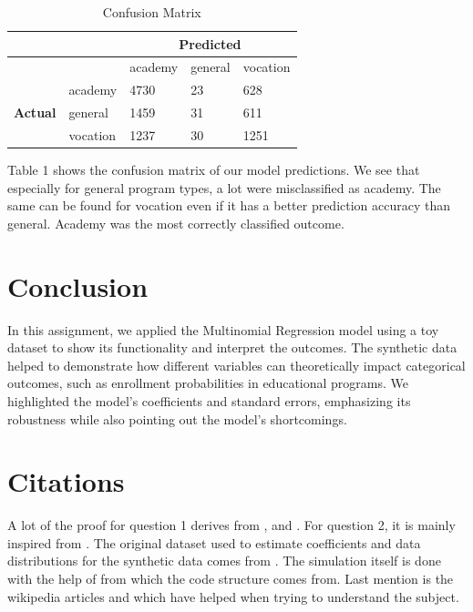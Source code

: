 \documentclass[12pt]{article}
\begin{document}
\begin{table}[h]
\centering
\begin{tabular}{|c|l|lll|}
\hline
\multicolumn{1}{|l|}{}           &          & \multicolumn{3}{c|}{\textbf{Predicted}}                                \\ \hline
\multicolumn{1}{|l|}{}           &          & \multicolumn{1}{l|}{academy} & \multicolumn{1}{l|}{general} & vocation \\ \hline
\multirow{3}{*}{\textbf{Actual}} & academy  & \multicolumn{1}{l|}{4730}    & \multicolumn{1}{l|}{23}      & 628      \\ \cline{2-5} 
                                 & general  & \multicolumn{1}{l|}{1459}    & \multicolumn{1}{l|}{31}      & 611      \\ \cline{2-5} 
                                 & vocation & \multicolumn{1}{l|}{1237}    & \multicolumn{1}{l|}{30}      & 1251     \\ \hline
\end{tabular}
\caption{Confusion Matrix}
\end{table}
Table 1 shows the confusion matrix of our model predictions. We see that especially for general program types, a lot were misclassified as academy. The same can be found for vocation even if it has a better prediction accuracy than general. Academy was the most correctly classified outcome.

\section*{Conclusion}
In this assignment, we applied the Multinomial Regression model using a toy dataset to show its functionality and interpret the outcomes. The synthetic data helped to demonstrate how different variables can theoretically impact categorical outcomes, such as enrollment probabilities in educational programs. We highlighted the model's coefficients and standard errors, emphasizing its robustness while also pointing out the model's shortcomings.

\section*{Citations}
A lot of the proof for question 1 derives from \cite{geyer_stat_nodate}, \cite{statisticsmatt_exponential_2019} and
\cite{stackex}. For question 2, it is mainly inspired from \cite{discdown}. The original dataset used to estimate coefficients and data distributions for the synthetic data comes from \cite{multinomial_example}. The simulation itself is done with the help of \cite{simulation_article} from which the code structure comes from. Last mention is the wikipedia articles \cite{wikipedia_multinomial} and \cite{wikipedia_exponential} which have helped when trying to understand the subject.
\end{document}
